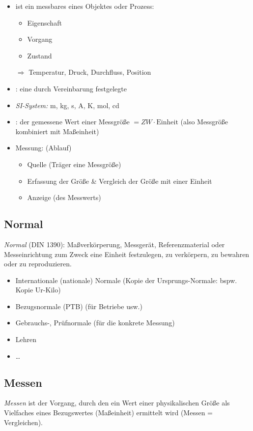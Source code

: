 \begin{itemize}
\item {} ist ein messbares  eines Objektes oder Prozess:
\begin{itemize}
\item Eigenschaft 
\item Vorgang
\item Zustand
\end{itemize}
$\Rightarrow$ Temperatur, Druck, Durchfluss, Position
\item {}: eine durch Vereinbarung festgelegte 
\item \emph{SI-System:} m, kg, s, A, K, mol, cd
\item {}: der gemessene Wert einer Messgröße 
$=ZW \cdot \mathrm{Einheit}$ 
(also Messgröße kombiniert mit Maßeinheit)
\item Messung: (Ablauf)
\begin{itemize}
\item Quelle (Träger eine Messgröße)
\item Erfassung der Größe \& Vergleich der Größe mit einer Einheit
\item Anzeige (des Messwerts)
\end{itemize}
\end{itemize}

\subsection{Normal}
\emph{Normal} (DIN 1390): Maßverkörperung, Messgerät, Referenzmaterial oder Messeinrichtung zum \linebreak 
Zweck eine Einheit festzulegen, zu verkörpern, zu bewahren oder zu reproduzieren.
\begin{itemize}
\item Internationale (nationale) Normale (Kopie der Ursprungs-Normale: bspw. Kopie Ur-Kilo)
\item Bezugsnormale (PTB) (für Betriebe usw.)
\item Gebrauchs-, Prüfnormale (für die konkrete Messung)
\item Lehren
\item …
\end{itemize}

\subsection{Messen}
\emph{Messen} ist der Vorgang, durch den ein Wert einer physikalischen Größe als Vielfaches eines Bezugswertes (Maßeinheit) ermittelt wird (Messen = Vergleichen).

